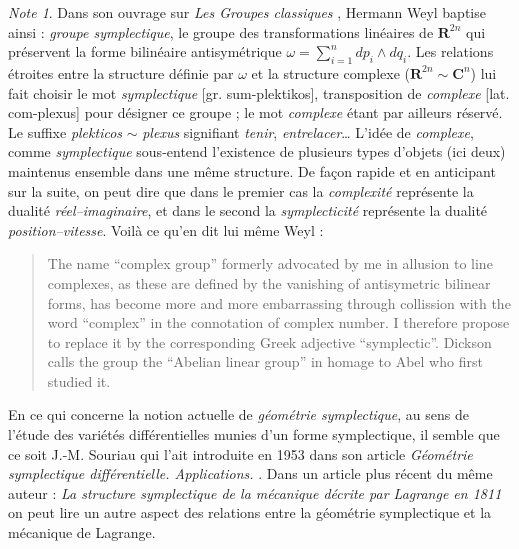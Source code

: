 \documentclass[12pt,paperletter, reqno]{amsart}
\newcommand{\RR}{\mathbf{R}}
\newcommand{\CC}{\mathbf{C}}
\theoremstyle{plain}
\theoremstyle{remark}
\newtheorem*{note}{Note}
\begin{document}
  \begin{note}
    Dans son ouvrage sur \emph{Les Groupes classiques} \cite{Weyl1},
    Hermann Weyl baptise ainsi :
    \emph{groupe symplectique},
    le groupe des transformations linéaires de $\RR^{2n}$ qui préservent la forme bilinéaire antisymétrique $\omega = \sum_{i=1}^n dp_i\wedge dq_i$.
    Les relations étroites entre la structure définie par $\omega$ et la structure complexe ($\RR^{2n}\sim \CC^n$) lui fait choisir le mot \emph{symplectique} [gr. sum-plektikos],
    transposition de \emph{complexe} [lat. com-plexus] pour désigner ce groupe ;
    le mot \emph{complexe} étant par ailleurs réservé.
    Le suffixe \emph{plekticos} $\sim$ \emph{plexus} signifiant \emph{tenir},
    \emph{entrelacer}\ldots
    L'idée de \emph{complexe},
    comme \emph{symplectique} sous-entend l'existence de plusieurs types d'objets (ici deux) maintenus ensemble dans une même structure.
    De façon rapide et en anticipant sur la suite,
    on peut dire que dans le premier cas la \emph{complexité} représente la dualité \emph{réel--imaginaire},
    et dans le second la \emph{symplecticité} représente la dualité \emph{position--vitesse}.
    Voilà ce qu'en dit lui même Weyl \cite[p. 165]{Weyl1} :
    
    \begin{quote}
      The name ``complex group'' formerly advocated by me in allusion to line complexes, as these are defined by the vanishing of antisymetric bilinear forms, has become more and more embarrassing through collission with the word ``complex'' in the connotation of complex number. I therefore propose to replace it by the corresponding Greek adjective ``symplectic''. Dickson calls the group the ``Abelian linear group'' in homage to Abel who first studied it.
    \end{quote}
    
    En ce qui concerne la notion actuelle de \emph{géométrie symplectique},
    au sens de l'étude des variétés différentielles munies d'un forme symplectique,
    il semble que ce soit J.-M. Souriau qui l'ait introduite en 1953 dans son article \emph{Géométrie symplectique différentielle. Applications.} \cite{Souriau20}.
    Dans un article plus récent du même auteur :
    \emph{La structure symplectique de la mécanique décrite par Lagrange en 1811} \cite{Souriau9} on peut lire un autre aspect des relations entre la géométrie symplectique et la mécanique de Lagrange.
  \end{note}
  
  
\end{document}
